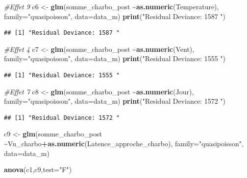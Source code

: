 \documentclass[
  french,
]{article}
\newenvironment{Shaded}{\begin{snugshade}}{\end{snugshade}}
\newcommand{\AttributeTok}[1]{\textcolor[rgb]{0.13,0.29,0.53}{#1}}
\newcommand{\CommentTok}[1]{\textcolor[rgb]{0.56,0.35,0.01}{\textit{#1}}}
\newcommand{\FunctionTok}[1]{\textcolor[rgb]{0.13,0.29,0.53}{\textbf{#1}}}
\newcommand{\NormalTok}[1]{#1}
\newcommand{\OtherTok}[1]{\textcolor[rgb]{0.56,0.35,0.01}{#1}}
\newcommand{\SpecialCharTok}[1]{\textcolor[rgb]{0.81,0.36,0.00}{\textbf{#1}}}
\newcommand{\StringTok}[1]{\textcolor[rgb]{0.31,0.60,0.02}{#1}}
\begin{document}
\begin{Shaded}
\begin{Highlighting}[]
\CommentTok{\#Effet 9}
\NormalTok{c6 }\OtherTok{\textless{}{-}} \FunctionTok{glm}\NormalTok{(somme\_charbo\_post }\SpecialCharTok{\textasciitilde{}}\FunctionTok{as.numeric}\NormalTok{(Temperature), }\AttributeTok{family=}\StringTok{"quasipoisson"}\NormalTok{, }\AttributeTok{data=}\NormalTok{data\_m)}
\FunctionTok{print}\NormalTok{(}\StringTok{"Residual Deviance: 1587 "}\NormalTok{)}
\end{Highlighting}
\end{Shaded}

\begin{verbatim}
## [1] "Residual Deviance: 1587 "
\end{verbatim}

\begin{Shaded}
\begin{Highlighting}[]
\CommentTok{\#Effet 4}
\NormalTok{c7 }\OtherTok{\textless{}{-}} \FunctionTok{glm}\NormalTok{(somme\_charbo\_post }\SpecialCharTok{\textasciitilde{}}\FunctionTok{as.numeric}\NormalTok{(Vent), }\AttributeTok{family=}\StringTok{"quasipoisson"}\NormalTok{, }\AttributeTok{data=}\NormalTok{data\_m)}
\FunctionTok{print}\NormalTok{(}\StringTok{"Residual Deviance: 1555 "}\NormalTok{)}
\end{Highlighting}
\end{Shaded}

\begin{verbatim}
## [1] "Residual Deviance: 1555 "
\end{verbatim}

\begin{Shaded}
\begin{Highlighting}[]
\CommentTok{\#Effet 7}
\NormalTok{c8 }\OtherTok{\textless{}{-}} \FunctionTok{glm}\NormalTok{(somme\_charbo\_post }\SpecialCharTok{\textasciitilde{}}\FunctionTok{as.numeric}\NormalTok{(Jour), }\AttributeTok{family=}\StringTok{"quasipoisson"}\NormalTok{, }\AttributeTok{data=}\NormalTok{data\_m)}
\FunctionTok{print}\NormalTok{(}\StringTok{"Residual Deviance: 1572 "}\NormalTok{)}
\end{Highlighting}
\end{Shaded}

\begin{verbatim}
## [1] "Residual Deviance: 1572 "
\end{verbatim}

\begin{Shaded}
\begin{Highlighting}[]
\NormalTok{c9 }\OtherTok{\textless{}{-}} \FunctionTok{glm}\NormalTok{(somme\_charbo\_post }\SpecialCharTok{\textasciitilde{}}\NormalTok{Vu\_charbo}\SpecialCharTok{+}\FunctionTok{as.numeric}\NormalTok{(Latence\_approche\_charbo), }\AttributeTok{family=}\StringTok{"quasipoisson"}\NormalTok{, }\AttributeTok{data=}\NormalTok{data\_m)}

\FunctionTok{anova}\NormalTok{(c1,c9,}\AttributeTok{test=}\StringTok{"F"}\NormalTok{)}
\end{Highlighting}
\end{Shaded}
\end{document}
